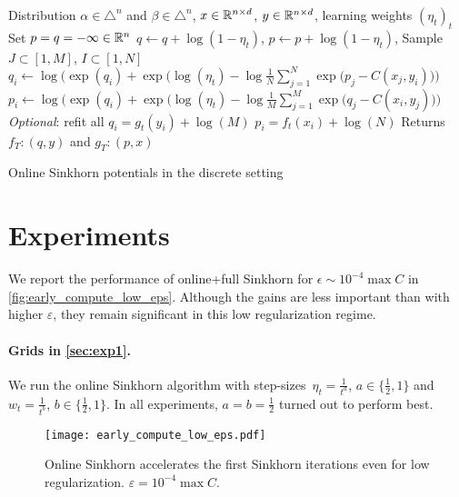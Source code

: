 \begin{algorithm}[t]
    \begin{algorithmic}
    \Input Distribution $\alpha \in \triangle^n$ and 
    $\beta \in \triangle^n$, $x \in \mathbb{R}^{n \times d}$, 
    $y \in \mathbb{R}^{n \times d}$, learning weights ${(\eta_t)}_t$
    \State Set $p = q = - \infty \in \mathbb{R}^n$
        \State $q \gets q + \log(1 - \eta_t)$, $p \gets p + \log(1 - \eta_t)$,
        \State Sample $J \subset [1, M]$, 
        $I \subset [1, N]$
            \State $q_i \gets \log \Big( \exp(q_i)
            + \exp\big(\log(\eta_t) - \log \frac{1}{N} 
            \sum_{j=1}^{N} \exp(p_j - C(x_j, y_i)\big) \Big) $
        \EndFor
        \State $p_i \gets \log \Big( \exp(q_i)
        + \exp \big( \log(\eta_t) - \log \frac{1}{M} 
        \sum_{j=1}^{M} \exp(q_j - C(x_i, y_j)\big) \Big)$
        \EndFor
        \State \textit{Optional}: refit all $q_i = g_t(y_i) + \log (M)$
        \State\hspace{2.45cm} $p_i = f_t(x_i) + \log (N)$
    \EndFor
    \State Returns $f_T : (q, y)$ and
    $g_T : (p, x)$
    \end{algorithmic}
    \caption{Online Sinkhorn potentials in the discrete setting}\label{alg:discrete_online}
\end{algorithm}



\section{Experiments}\label{sec:supp_exp}

We report the performance of online+full Sinkhorn for $\epsilon \sim 10^{-4}
\max C$ in \autoref{fig:early_compute_low_eps}. Although the gains are less
important than with higher $\varepsilon$, they remain significant in this low
regularization regime.

\paragraph{Grids in \autoref{sec:exp1}.} We run the online Sinkhorn algorithm
with step-sizes $\eta_t = \frac{1}{t^a}$, $a \in \{ \frac{1}{2}, 1 \}$
and $w_t = \frac{1}{{t^b}}$, $b \in \{ \frac{1}{2}, 1 \}$. In all
experiments, $a = b = \frac{1}{2}$ turned out to perform best.

\begin{figure}[ht]
    \centering
    \texttt{[image: early\_compute\_low\_eps.pdf]}
    \caption{Online Sinkhorn accelerates the first Sinkhorn iterations even for low regularization. $\varepsilon = 10^{-4} \max C$.}
    \label{fig:early_compute_low_eps}
\end{figure}
